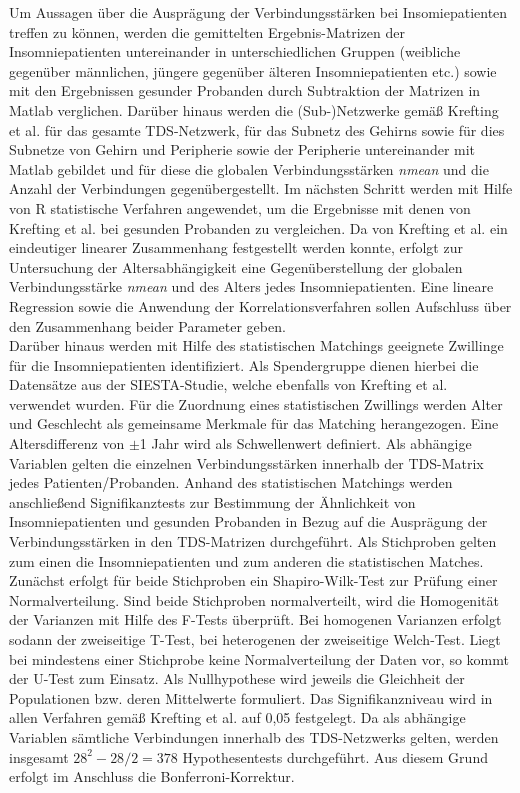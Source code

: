 Um Aussagen über die Ausprägung der Verbindungsstärken bei Insomiepatienten treffen zu können, werden die gemittelten Ergebnis-Matrizen der Insomniepatienten untereinander in unterschiedlichen Gruppen (weibliche gegenüber männlichen, jüngere gegenüber älteren Insomniepatienten etc.) sowie mit den Ergebnissen gesunder Probanden durch Subtraktion der Matrizen in Matlab verglichen. Darüber hinaus werden die (Sub-)Netzwerke gemäß Krefting et al. für das gesamte \acs{TDS}-Netzwerk, für das Subnetz des Gehirns sowie für dies Subnetze von Gehirn und Peripherie sowie der Peripherie untereinander mit Matlab gebildet und für diese die globalen Verbindungsstärken \textit{nmean} und die Anzahl der Verbindungen gegenübergestellt. Im nächsten Schritt werden mit Hilfe von R statistische Verfahren angewendet, um die Ergebnisse mit denen von Krefting et al. bei gesunden Probanden zu vergleichen. Da von Krefting et al. ein eindeutiger linearer Zusammenhang festgestellt werden konnte, erfolgt zur Untersuchung der Altersabhängigkeit eine Gegenüberstellung der globalen Verbindungsstärke \textit{nmean} und des Alters jedes Insomniepatienten. Eine lineare Regression sowie die Anwendung der Korrelationsverfahren sollen Aufschluss über den Zusammenhang beider Parameter geben.\\

Darüber hinaus werden mit Hilfe des statistischen Matchings geeignete Zwillinge für die Insomniepatienten identifiziert. Als Spendergruppe dienen hierbei die Datensätze aus der SIESTA-Studie, welche ebenfalls von Krefting et al. verwendet wurden. Für die Zuordnung eines statistischen Zwillings werden Alter und Geschlecht als gemeinsame Merkmale für das Matching herangezogen. Eine Altersdifferenz von $\pm$1 Jahr wird als Schwellenwert definiert. Als abhängige Variablen gelten die einzelnen Verbindungsstärken innerhalb der \acs{TDS}-Matrix jedes Patienten/Probanden. Anhand des statistischen Matchings werden anschließend Signifikanztests zur Bestimmung der Ähnlichkeit von Insomniepatienten und gesunden Probanden in Bezug auf die Ausprägung der Verbindungsstärken in den \acs{TDS}-Matrizen durchgeführt. Als Stichproben gelten zum einen die Insomniepatienten und zum anderen die statistischen Matches. Zunächst erfolgt für beide Stichproben ein Shapiro-Wilk-Test zur Prüfung einer Normalverteilung. Sind beide Stichproben normalverteilt, wird die Homogenität der Varianzen mit Hilfe des F-Tests überprüft. Bei homogenen Varianzen erfolgt sodann der zweiseitige T-Test, bei heterogenen der zweiseitige Welch-Test. Liegt bei mindestens einer Stichprobe keine Normalverteilung der Daten vor, so kommt der U-Test zum Einsatz. Als Nullhypothese wird jeweils die Gleichheit der Populationen bzw. deren Mittelwerte formuliert. Das Signifikanzniveau wird in allen Verfahren gemäß Krefting et al. auf 0,05 festgelegt. Da als abhängige Variablen sämtliche Verbindungen innerhalb des \acs{TDS}-Netzwerks gelten, werden insgesamt $28^2-28/2 = 378$ Hypothesentests durchgeführt. Aus diesem Grund erfolgt im Anschluss die Bonferroni-Korrektur.\\

